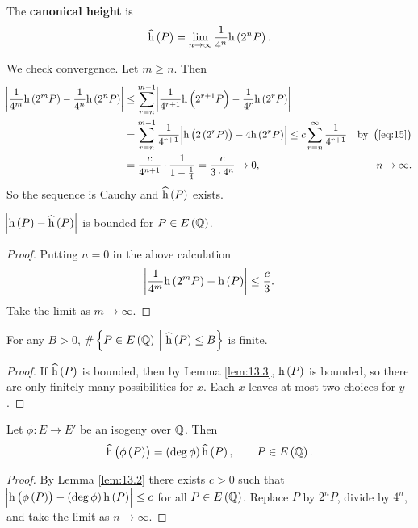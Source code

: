 \begin{definition*}
The \textbf{canonical height} is
$$ \widehat{\h}\br{P} = \lim_{n \to \infty} \dfrac{1}{4^n}\h\br{2^nP}. $$
\end{definition*}

We check convergence. Let $ m \ge n $. Then
\begin{align*}
\abs{\dfrac{1}{4^m}\h\br{2^mP} - \dfrac{1}{4^n}\h\br{2^nP}}
& \le \sum_{r = n}^{m - 1} \abs{\dfrac{1}{4^{r + 1}}\h\br{2^{r + 1}P} - \dfrac{1}{4^r}\h\br{2^rP}} \\
& = \sum_{r = n}^{m - 1} \dfrac{1}{4^{r + 1}}\abs{\h\br{2\br{2^rP}} - 4\h\br{2^rP}}
\le c\sum_{r = n}^\infty \dfrac{1}{4^{r + 1}} & \text{by} \ \br{\ref{eq:15}} \\
& = \dfrac{c}{4^{n + 1}} \cdot \dfrac{1}{1 - \tfrac{1}{4}}
= \dfrac{c}{3 \cdot 4^n}
\to 0, & n \to \infty.
\end{align*}
So the sequence is Cauchy and $ \widehat{\h}\br{P} $ exists.

\pagebreak

\begin{lemma}
\label{lem:13.3}
$ \abs{\h\br{P} - \widehat{\h}\br{P}} $ is bounded for $ P \in E\br{\QQ} $.
\end{lemma}

\begin{proof}
Putting $ n = 0 $ in the above calculation
$$ \abs{\dfrac{1}{4^m}\h\br{2^mP} - \h\br{P}} \le \dfrac{c}{3}. $$
Take the limit as $ m \to \infty $.
\end{proof}

\begin{corollary}
For any $ B > 0 $, $ \#\cbr{P \in E\br{\QQ} \st \widehat{\h}\br{P} \le B} $ is finite.
\end{corollary}

\begin{proof}
If $ \widehat{\h}\br{P} $ is bounded, then by Lemma \ref{lem:13.3}, $ \h\br{P} $ is bounded, so there are only finitely many possibilities for $ x $. Each $ x $ leaves at most two choices for $ y $.
\end{proof}

\begin{lemma}
\label{lem:13.5}
Let $ \phi : E \to E' $ be an isogeny over $ \mathbb{Q} $. Then
$$ \widehat{\h}\br{\phi\br{P}} = \br{\deg \phi}\widehat{\h}\br{P}, \qquad P \in E\br{\QQ}. $$
\end{lemma}

\begin{proof}
By Lemma \ref{lem:13.2} there exists $ c > 0 $ such that $ \abs{\h\br{\phi\br{P}} - \br{\deg \phi}\h\br{P}} \le c $ for all $ P \in E\br{\QQ} $. Replace $ P $ by $ 2^nP $, divide by $ 4^n $, and take the limit as $ n \to \infty $.
\end{proof}

